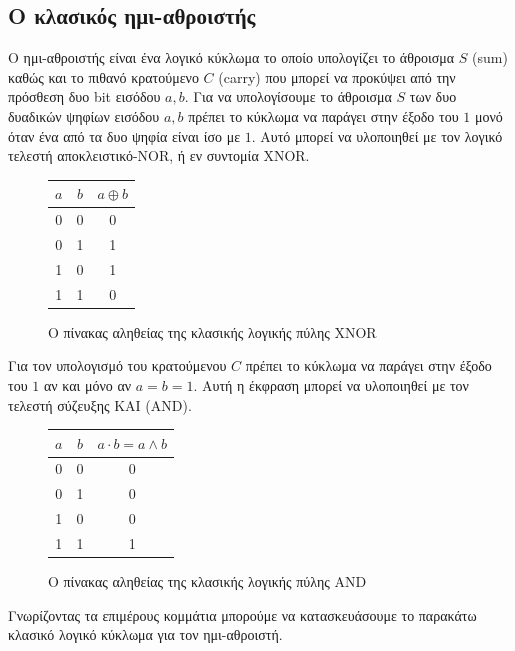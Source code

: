 \subsection{Ο κλασικός ημι-αθροιστής}
Ο ημι-αθροιστής είναι ένα λογικό κύκλωμα το οποίο υπολογίζει
το άθροισμα $S$ (sum) καθώς και το πιθανό κρατούμενο $C$ (carry)
που μπορεί να προκύψει από την πρόσθεση δυο bit εισόδου $a, b$.
Για να υπολογίσουμε το άθροισμα $S$ των δυο δυαδικών ψηφίων εισόδου $a, b$ πρέπει
το κύκλωμα να παράγει στην έξοδο του $1$ μονό όταν ένα από τα δυο ψηφία είναι
ίσο με $1$. Αυτό μπορεί να υλοποιηθεί με τον λογικό τελεστή αποκλειστικό-NOR,
ή εν συντομία XNOR.

\begin{figure}[h]
    \label{fig:1}
    \centering
    \begin{tabular}{c c|c}
        $a$ & $b$ & $a \oplus b$ \\
        \hline
        0 & 0 & 0 \\
        0 & 1 & 1 \\
        1 & 0 & 1 \\
        1 & 1 & 0 \\
    \end{tabular}
    \caption{Ο πίνακας αληθείας της κλασικής λογικής πύλης XNOR}
\end{figure}

Για τον υπολογισμό του κρατούμενου $C$ πρέπει το κύκλωμα να παράγει στην
έξοδο του $1$ αν και μόνο αν $a = b = 1$. Αυτή η έκφραση μπορεί να
υλοποιηθεί με τον τελεστή σύζευξης ΚΑΙ (AND).

\begin{figure}[h]
    \label{fig:2}
    \centering
    \begin{tabular}{c c|c}
        $a$ & $b$ & $a \cdot b = a \land b$ \\
        \hline
        0 & 0 & 0 \\
        0 & 1 & 0 \\
        1 & 0 & 0 \\
        1 & 1 & 1 \\
    \end{tabular}
    \caption{Ο πίνακας αληθείας της κλασικής λογικής πύλης AND}
\end{figure}

Γνωρίζοντας τα επιμέρους κομμάτια μπορούμε να κατασκευάσουμε το παρακάτω
κλασικό λογικό κύκλωμα για τον ημι-αθροιστή.

